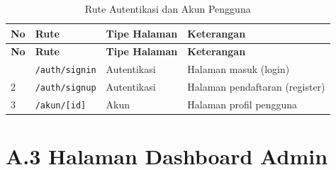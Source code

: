 \documentclass[12pt,a4paper]{report}
\begin{document}
\begin{longtable}{p{} p{} p{} p{}}
    \caption{Rute Autentikasi dan Akun Pengguna}\\
    \toprule
    \textbf{No} & \textbf{Rute} & \textbf{Tipe Halaman} & \textbf{Keterangan} \\
    \midrule
    \endfirsthead
    \toprule
    \textbf{No} & \textbf{Rute} & \textbf{Tipe Halaman} & \textbf{Keterangan} \\
    \midrule
    \endhead
    \bottomrule
    \endfoot
    1 & \texttt{/auth/signin} & Autentikasi & Halaman masuk (login) \\
    2 & \texttt{/auth/signup} & Autentikasi & Halaman pendaftaran (register) \\
    3 & \texttt{/akun/[id]} & Akun & Halaman profil pengguna \\
    \end{longtable}

\section*{A.3 Halaman Dashboard Admin}
\end{document}
